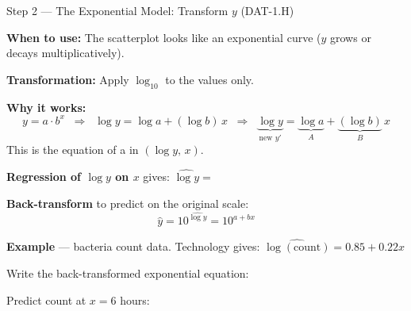 \documentclass[10pt]{article}
\begin{document}
\begin{notesbox}{Step 2 --- The Exponential Model: Transform $y$ (DAT-1.H)}
\small

\noindent \textbf{When to use:} The scatterplot looks like an exponential curve
($y$ grows or decays multiplicatively).

\vspace{6pt}
\textbf{Transformation:} Apply $\log_{10}$ to the  values only.

\vspace{4pt}
\textbf{Why it works:}
\[
  y = a \cdot b^x
  \;\;\Longrightarrow\;\;
  \log y = \log a + (\log b)\,x
  \;\;\Longrightarrow\;\;
  \underbrace{\log y}_{\text{new } y'} = \underbrace{\log a}_{A} + \underbrace{(\log b)}_{B}\,x
\]
This is the equation of a  in $(\log y,\, x)$.

\vspace{8pt}
\textbf{Regression of $\log y$ on $x$} gives: \quad $\widehat{\log y} = $ 

\vspace{6pt}
\textbf{Back-transform} to predict on the original scale:
\[
  \hat{y} = 10^{\widehat{\log y}} = 10^{a + bx}
\]

\vspace{6pt}
\textbf{Example} --- bacteria count data. Technology gives: $\widehat{\log(\text{count})} = 0.85 + 0.22x$

\vspace{4pt}
Write the back-transformed exponential equation:

\vspace{4pt}
Predict count at $x = 6$ hours:

\end{notesbox}

\vspace{0.1in}
\end{document}
